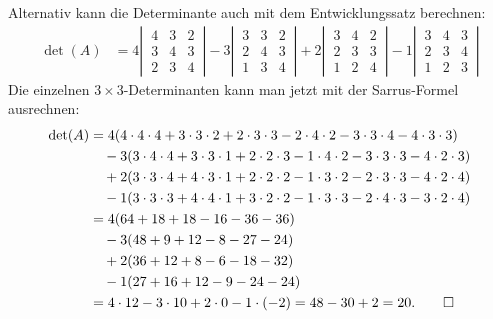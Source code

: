 \begin{loesung}
Alternativ kann die Determinante auch mit dem Entwicklungssatz berechnen:
\begin{align*}
\det(A)
&=
4
\left|\,
\begin{matrix}
4&3&2\\
3&4&3\\
2&3&4
\end{matrix}
\,\right|
-3
\left|\,
\begin{matrix}
3&3&2\\
2&4&3\\
1&3&4
\end{matrix}
\,\right|
+2
\left|\,
\begin{matrix}
3&4&2\\
2&3&3\\
1&2&4
\end{matrix}
\,\right|
-1
\left|\,
\begin{matrix}
3&4&3\\
2&3&4\\
1&2&3
\end{matrix}
\,\right|
\end{align*}
Die einzelnen $3\times 3$-Determinanten kann man jetzt mit der Sarrus-Formel
ausrechnen:
\begin{align*}
\det(A)
&=
4(4\cdot 4\cdot 4 + 3\cdot 3\cdot 2 +2\cdot 3 \cdot 3
-2\cdot 4\cdot 2-3\cdot 3\cdot 4-4\cdot 3\cdot 3)
\\
&\quad-3(3\cdot 4\cdot 4+3\cdot 3\cdot 1+2\cdot 2\cdot 3
-1\cdot 4\cdot 2-3\cdot 3\cdot 3-4\cdot 2\cdot 3)
\\
&\quad+2(3\cdot 3\cdot 4+4\cdot 3\cdot 1+2\cdot 2\cdot 2
-1\cdot 3\cdot 2-2\cdot 3\cdot 3-4\cdot 2\cdot 4)
\\
&\quad-1(3\cdot 3\cdot 3+4\cdot 4\cdot 1+3\cdot 2\cdot 2
-1\cdot 3\cdot 3-2\cdot 4\cdot 3 - 3\cdot 2\cdot 4)
\\
&=
4(64 + 18 + 18 -16-36-36)
\\
&\quad-3(48+9+12 -8-27-24)
\\
&\quad+2(36+12+8 -6-18-32)
\\
&\quad-1(27+16+12 -9-24 - 24)
\\
&=
4\cdot 12
-3\cdot 10
+2\cdot 0
-1\cdot (-2)
=48-30+2=20.
\qedhere
\end{align*}
\end{loesung}
